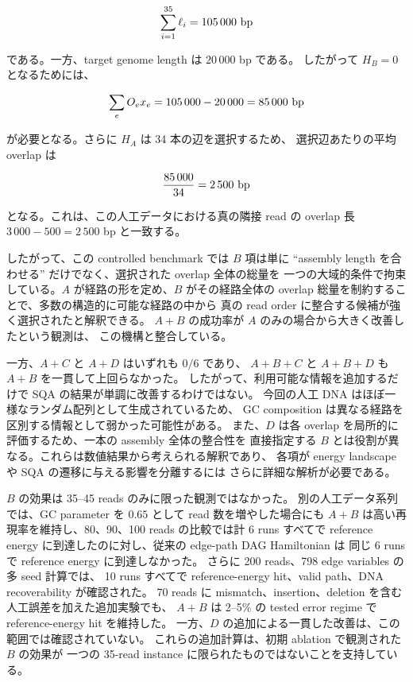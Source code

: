 \documentclass[a4j,10pt]{ujarticle}
\begin{document}
\[
\sum_{i=1}^{35}\ell_i
=
105\,000\ {\rm bp}
\]

である。一方、target genome length は $20\,000$ bp である。
したがって $H_B=0$ となるためには、

\[
\sum_e O_e x_e
=
105\,000-20\,000
=
85\,000\ {\rm bp}
\]

が必要となる。さらに $H_A$ は 34 本の辺を選択するため、
選択辺あたりの平均 overlap は

\[
\frac{85\,000}{34}
=
2\,500\ {\rm bp}
\]

となる。これは、この人工データにおける真の隣接 read の overlap 長
$3\,000-500=2\,500$ bp と一致する。

したがって、この controlled benchmark では $B$ 項は単に
``assembly length を合わせる'' だけでなく、選択された overlap 全体の総量を
一つの大域的条件で拘束している。$A$ が経路の形を定め、$B$ がその経路全体の
overlap 総量を制約することで、多数の構造的に可能な経路の中から
真の read order に整合する候補が強く選択されたと解釈できる。
$A+B$ の成功率が $A$ のみの場合から大きく改善したという観測は、
この機構と整合している。

一方、$A+C$ と $A+D$ はいずれも $0/6$ であり、
$A+B+C$ と $A+B+D$ も $A+B$ を一貫して上回らなかった。
したがって、利用可能な情報を追加するだけで SQA の結果が単調に改善するわけではない。
今回の人工 DNA はほぼ一様なランダム配列として生成されているため、
GC composition は異なる経路を区別する情報として弱かった可能性がある。
また、$D$ は各 overlap を局所的に評価するため、一本の assembly 全体の整合性を
直接指定する $B$ とは役割が異なる。これらは数値結果から考えられる解釈であり、
各項が energy landscape や SQA の遷移に与える影響を分離するには
さらに詳細な解析が必要である。

$B$ の効果は 35--45 reads のみに限った観測ではなかった。
別の人工データ系列では、GC parameter を $0.65$ として read 数を増やした場合にも
$A+B$ は高い再現率を維持し、80、90、100 reads の比較では計 6 runs すべてで
reference energy に到達したのに対し、従来の edge-path DAG Hamiltonian は
同じ 6 runs で reference energy に到達しなかった。
さらに 200 reads、798 edge variables の多 seed 計算では、
10 runs すべてで reference-energy hit、valid path、DNA recoverability が確認された。
70 reads に mismatch、insertion、deletion を含む人工誤差を加えた追加実験でも、
$A+B$ は 2--5\% の tested error regime で reference-energy hit を維持した。
一方、$D$ の追加による一貫した改善は、この範囲では確認されていない。
これらの追加計算は、初期 ablation で観測された $B$ の効果が
一つの 35-read instance に限られたものではないことを支持している。
\end{document}
